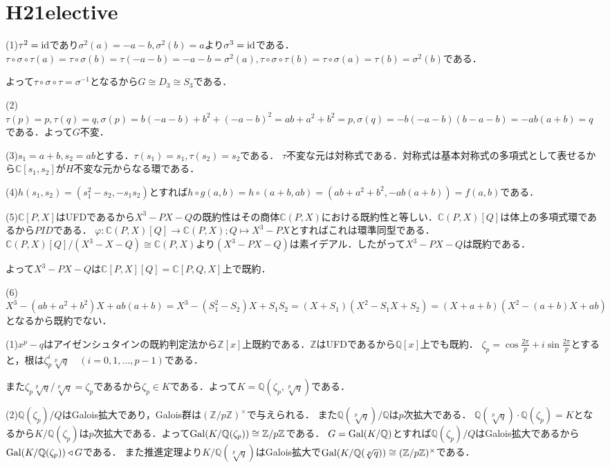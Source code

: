 \documentclass[
		book,
		head_space=20mm,
		foot_space=20mm,
		gutter=10mm,
		line_length=190mm
]{jlreq}
\begin{document}
\section{H21elective}
(1)$\tau^2=\mathop{\mathrm{id}}$であり$\sigma^2(a)=-a-b,\sigma^2(b)=a$より$\sigma^3=\mathop{\mathrm{id}}$である．
$\tau\circ\sigma\circ\tau(a)=\tau\circ\sigma(b)=\tau(-a-b)=-a-b=\sigma^2(a),\tau\circ\sigma\circ\tau(b)=\tau\circ\sigma(a)=\tau(b)=\sigma^2(b)$である．

よって$\tau\circ\sigma\circ\tau=\sigma^{-1}$となるから$G\cong D_3\cong S_3$である．

(2)$\tau(p)=p,\tau(q)=q,\sigma(p)=b(-a-b)+b^2+(-a-b)^2=ab+a^2+b^2=p,\sigma(q)=-b(-a-b)(b-a-b)=-ab(a+b)=q$である．よって$G$不変．

(3)$s_1=a+b,s_2=ab$とする．$\tau(s_1)=s_1,\tau(s_2)=s_2$である．
$\tau$不変な元は対称式である．対称式は基本対称式の多項式として表せるから$\mathbb{C}[s_1,s_2]$が$H$不変な元からなる環である．

(4)$h(s_1,s_2)=(s_1^2-s_2,-s_1s_2)$とすれば$h \circ g(a,b)=h\circ(a+b,ab)=(ab+a^2+b^2,-ab(a+b))=f(a,b)$である．

(5)$\mathbb{C}[P,X]$はUFDであるから$X^3-PX-Q$の既約性はその商体$\mathbb{C}(P,X)$における既約性と等しい．$\mathbb{C}(P,X)[Q]$は体上の多項式環であるから$PID$である．
$\varphi\colon \mathbb{C}(P,X)[Q]\rightarrow \mathbb{C}(P,X);Q\mapsto X^3-PX$とすればこれは環準同型である．$\mathbb{C}(P,X)[Q]/(X^3-X-Q)\cong \mathbb{C}(P,X)$より$(X^3-PX-Q)$は素イデアル．したがって$X^3-PX-Q$は既約である．

よって$X^3-PX-Q$は$\mathbb{C}[P,X][Q]=\mathbb{C}[P,Q,X]$上で既約．

(6)$X^3-(ab+a^2+b^2)X+ab(a+b)=X^3-(S_1^2-S_2)X+S_1S_2=(X+S_1)(X^2-S_1X+S_2)=(X+a+b)(X^2-(a+b)X+ab)$となるから既約でない．

(1)$x^p-q$はアイゼンシュタインの既約判定法から$\mathbb{Z}[x]$上既約である．$\mathbb{Z}$はUFDであるから$\mathbb{Q}[x]$上でも既約．
$\zeta_p=\cos\frac{2\pi }{p}+i\sin \frac{2\pi}{p}$とすると，根は$\zeta_p^i \sqrt[p]{q}\quad(i=0,1,\dots,p-1)$である．

また$\zeta_p\sqrt[p]{q}/\sqrt[p]{q}=\zeta_p$であるから$\zeta_p\in K$である．よって$K=\mathbb{Q}(\zeta_p,\sqrt[p]{q})$である．

(2)$\mathbb{Q}(\zeta_p)/Q$はGalois拡大であり，Galois群は$(\mathbb{Z}/p \mathbb{Z})^\times$で与えられる．
また$\mathbb{Q}(\sqrt[p]{q})/\mathbb{Q}$は$p$次拡大である．
$\mathbb{Q}(\sqrt[p]{q})\cdot \mathbb{Q}(\zeta_p)=K$となるから$K/\mathbb{Q}(\zeta_p)$は$p$次拡大である．よって$\mathop{\mathrm{Gal}}(K/\mathbb{Q}(\zeta_p))\cong \mathbb{Z}/p \mathbb{Z}$である．
$G=\mathop{\mathrm{Gal}}(K/\mathbb{Q})$とすれば$\mathbb{Q}(\zeta_p)/Q$はGalois拡大であるから$\mathop{\mathrm{Gal}}(K/\mathbb{Q}(\zeta_p)) \triangleleft G$である．
また推進定理より$K/\mathbb{Q}(\sqrt[p]{q})$はGalois拡大で$\mathop{\mathrm{Gal}}(K/\mathbb{Q}(\sqrt[p]{q}))\cong (\mathbb{Z}/ p \mathbb{Z})^\times$である．
\end{document}
